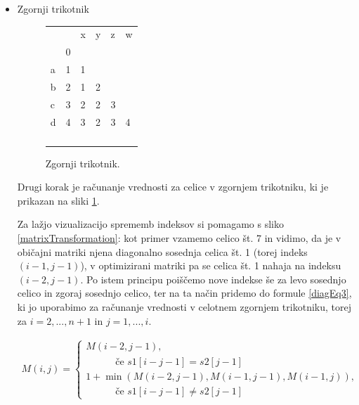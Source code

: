 \documentclass[a4paper,12pt,openright]{book}
\begin{document}
\begin{itemize}
    \item Zgornji trikotnik
    
\begin{figure}[htb]
\centering
\begin{tabular}{|l|l|l|l|l|l|}
\cline{3-6}
\multicolumn{2}{c|}{}  & x & y & z & w \\ \cline{2-6}
\multicolumn{1}{c|}{} & 0 & \multicolumn{4}{c}{} \\ \cline{1-3}
a  & 1 & 1 &  \multicolumn{3}{c}{} \\ \cline{1-4}
b  & 2 & \cellcolor{blue!15}1 & 2 & \multicolumn{2}{c}{} \\ \cline{1-5}
c  & 3 & \cellcolor{blue!15}2 & \cellcolor{blue!15}2 & 3 & \multicolumn{1}{c}{} \\ \cline{1-6}
d  & 4 & \cellcolor{blue!15}3 & \cellcolor{blue!15}2 & \cellcolor{blue!15}3 & 4 \\ \hline
 \multicolumn{1}{c|}{} & & & & & \multicolumn{1}{c}{} \\ \cline{2-5}
\multicolumn{1}{c|}{} & & & & \multicolumn{2}{c}{} \\ \cline{2-4}
\multicolumn{1}{c|}{} & & & \multicolumn{3}{c}{} \\ \cline{2-3}
\multicolumn{1}{c|}{} & & \multicolumn{4}{c}{} \\ \cline{2-2}
\end{tabular}
\caption{Zgornji trikotnik.}
\label{diagMemory2}
\end{figure}

Drugi korak je računanje vrednosti za celice v zgornjem trikotniku, ki je prikazan na sliki \ref{diagMemory2}. 

Za lažjo vizualizacijo sprememb indeksov si pomagamo s sliko \ref{matrixTransformation}: kot primer vzamemo celico št. 7 in vidimo, da je v običajni matriki njena diagonalno sosednja celica št. 1 (torej indeks $(i-1, j-1)$), v optimizirani matriki pa se celica št. 1 nahaja na indeksu $(i-2, j-1)$. Po istem principu poiščemo nove indekse še za levo sosednjo celico in zgoraj sosednjo celico, ter na ta način pridemo do formule \ref{diagEq3}, ki jo uporabimo za računanje vrednosti v celotnem zgornjem trikotniku, torej za $i=2,...,n+1$ in $j=1,...,i$. 
        
\begin{equation}
\label{diagEq3}
\begin{aligned}
M(i, j) =
\begin{cases}
     M(i-2, j-1) ,     \\ \quad \quad \quad \text{če } s1[i-j-1]=s2[j-1]\\
     1 + \min(M(i-2, j-1), M(i-1, j-1), M(i-1, j)) , \\ \quad \quad \quad \text{če } s1[i-j-1] \neq s2[j-1]
  \end{cases}
\end{aligned}
\end{equation}


\end{itemize}
\end{document}
